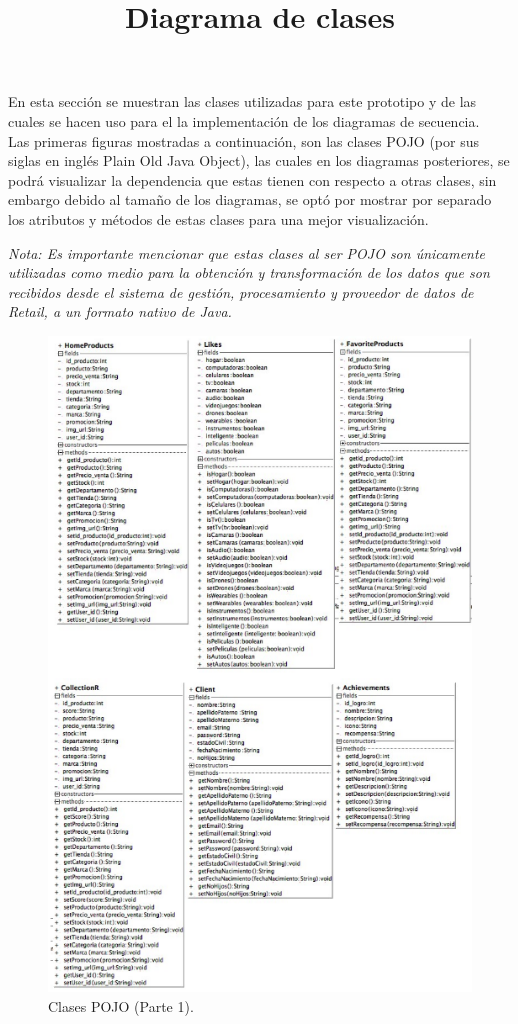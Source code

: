 \title{\textbf{Diagrama  de clases}\\ \par}
En esta sección se muestran las clases utilizadas para este prototipo y de las cuales se hacen uso para el la implementación de los diagramas de secuencia.\\
Las primeras figuras mostradas a continuación, son las clases POJO (por sus siglas en inglés Plain Old Java Object), las cuales en los diagramas posteriores, se podrá visualizar la dependencia que estas tienen con respecto a otras clases, sin embargo debido al tamaño de los diagramas, se optó por mostrar por separado los atributos y métodos de estas clases para una mejor visualización.
\\ \par
\textit{Nota: Es importante mencionar que estas clases al ser POJO son únicamente utilizadas como medio para la obtención y transformación de los datos que son recibidos desde el sistema de gestión, procesamiento y proveedor de datos de Retail, a un formato nativo de Java.}
\FloatBarrier
\begin{figure}[htbp!]
		\centering
			\includegraphics[width=.63 \textwidth]{imagenes/aidp_clases/pojo1n}
		\caption{Clases POJO (Parte 1).}
		\label{image:pojo1}
\end{figure}
\FloatBarrier
\FloatBarrier
